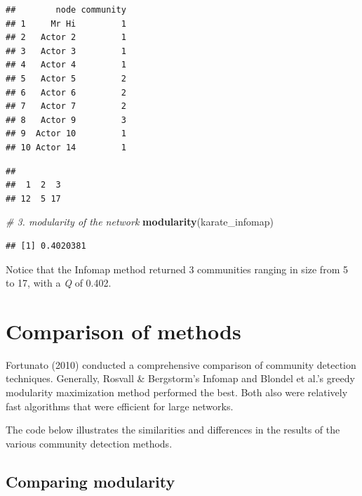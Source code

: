 \documentclass[
]{book}
\newenvironment{Shaded}{\begin{snugshade}}{\end{snugshade}}
\newcommand{\CommentTok}[1]{\textcolor[rgb]{0.56,0.35,0.01}{\textit{#1}}}
\newcommand{\FunctionTok}[1]{\textcolor[rgb]{0.13,0.29,0.53}{\textbf{#1}}}
\newcommand{\NormalTok}[1]{#1}
\newcommand{\SpecialCharTok}[1]{\textcolor[rgb]{0.81,0.36,0.00}{\textbf{#1}}}
\begin{document}
\begin{verbatim}
##        node community
## 1     Mr Hi         1
## 2   Actor 2         1
## 3   Actor 3         1
## 4   Actor 4         1
## 5   Actor 5         2
## 6   Actor 6         2
## 7   Actor 7         2
## 8   Actor 9         3
## 9  Actor 10         1
## 10 Actor 14         1
\end{verbatim}

\begin{Shaded}
\end{Shaded}

\begin{verbatim}
## 
##  1  2  3 
## 12  5 17
\end{verbatim}

\begin{Shaded}
\begin{Highlighting}[]
\CommentTok{\# 3. modularity of the network }
\FunctionTok{modularity}\NormalTok{(karate\_infomap)  }
\end{Highlighting}
\end{Shaded}

\begin{verbatim}
## [1] 0.4020381
\end{verbatim}

Notice that the Infomap method returned 3 communities ranging in size from 5 to 17, with a \emph{Q} of 0.402.

\section{Comparison of methods}\label{comparison-of-methods}

Fortunato (2010) conducted a comprehensive comparison of community detection techniques. Generally, Rosvall \& Bergstorm's Infomap and Blondel et al.'s greedy modularity maximization method performed the best. Both also were relatively fast algorithms that were efficient for large networks.

The code below illustrates the similarities and differences in the results of the various community detection methods.

\subsection{Comparing modularity}\label{comparing-modularity}
\end{document}
